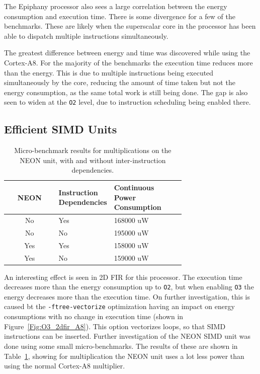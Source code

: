 \documentclass[twocolumn]{article}
\let\oldcaption\caption
\renewcommand{\caption}[1]{\oldcaption{\textup{#1}}}
\begin{document}
The Epiphany processor also sees a large correlation between the energy consumption and execution time. There is some divergence for a few of the benchmarks. These are likely when the superscalar core in the processor has been able to dispatch multiple instructions simultaneously.

The greatest difference between energy and time was discovered while using the Cortex-A8. For the majority of the benchmarks the execution time reduces more than the energy. This is due to multiple instructions being executed simultaneously by the core, reducing the amount of time taken but not the energy consumption, as the same total work is still being done. The gap is also seen to widen at the \texttt{O2} level, due to instruction scheduling being enabled there.

\subsection{Efficient SIMD Units}

\begin{table}
	\centering
	\begin{tabular}{c p{0.3\linewidth} p{0.4\linewidth}}
		\bfseries NEON & \bfseries Instruction Dependencies & \bfseries Continuous Power Consumption \\
		\hline
		No & \centering Yes & {\hspace{0.85cm} 168000 uW } \\
		No & \centering No & {\hspace{0.85cm} 195000 uW } \\
		Yes & \centering Yes & {\hspace{0.85cm} 158000 uW } \\
		Yes & \centering No & {\hspace{0.85cm} 159000 uW } \\
	\end{tabular}
	\caption{Micro-benchmark results for multiplications on the NEON unit, with and without inter-instruction dependencies.}
	\label{Table:SIMD}
\end{table}

An interesting effect is seen in 2D FIR for this processor. The execution time decreases more than the energy consumption up to \texttt{O2}, but when enabling \texttt{O3} the energy decreases more than the execution time. On further investigation, this is caused bt the \texttt{-ftree-vectorize} optimization having an impact on energy consumptions with no change in execution time (shown in Figure~\ref{Fig:O3_2dfir_A8}). This option vectorizes loops, so that SIMD instructions can be inserted. Further investigation of the NEON SIMD unit was done using some small micro-benchmarks. The results of these are shown in Table~\ref{Table:SIMD}, showing for multiplication the NEON unit uses a lot less power than using the normal Cortex-A8 multiplier.
\end{document}
